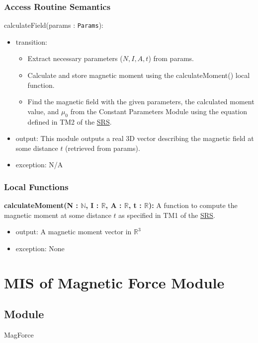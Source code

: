 \documentclass[12pt, titlepage]{article}
\begin{document}
\subsubsection{Access Routine Semantics}

\noindent calculateField(params : \texttt{Params}):
\begin{itemize}
\item transition:
\begin{itemize}
  \item Extract necessary parameters ($N, I, A, t$) from params. 
  \item Calculate and store magnetic moment using the calculateMoment() local function.
  \item Find the magnetic field with the given parameters, the calculated moment value, and $\mu_0$ from the Constant Parameters Module using the equation defined in TM2 of the \href{https://github.com/husseinsd1/optimal-em-arrangement/blob/main/docs/SRS/SRS.pdf}{SRS}. 
\end{itemize}
\item output: This module outputs a real 3D vector describing the magnetic field at some distance $t$ (retrieved from params).
\item exception: N/A
\end{itemize}

\subsubsection{Local Functions}
\textbf{calculateMoment(N : $\mathbb{N}$, I : $\mathbb{R}$, A : $\mathbb{R}$, t : $\mathbb{R}$):} A function to compute the magnetic moment at some distance $t$ as specified in TM1 of the \href{https://github.com/husseinsd1/optimal-em-arrangement/blob/main/docs/SRS/SRS.pdf}{SRS}.
\begin{itemize}
  \item output: A magnetic moment vector in $\mathbb{R}^3$
  \item exception: None
\end{itemize}

\newpage

\section{MIS of Magnetic Force Module} \label{MISMagForce}

\subsection{Module}
MagForce 
\end{document}
